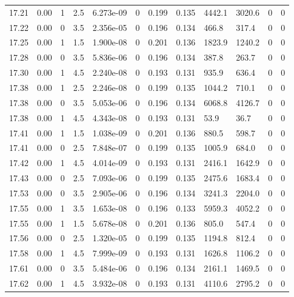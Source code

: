 \documentclass[preview]{standalone}
\begin{document}
{{{{{{{{{{{{{{{{{{\begin{tabular}{L{1.2cm}C{1.2cm} C{0.3cm}C{0.5cm} C{1.4cm}C{1.4cm} C{1.4cm}C{1.4cm} C{1.6cm}C{1.6cm} C{1.6cm}C{1.6cm}}
  17.21  &  0.00  & 1     & 2.5 &  6.273e-09  & 0  &  0.199&   0.135& 4442.1 & 3020.6   &  0 & 0  \\ 
  17.22  &  0.00  & 0     & 3.5 &  2.356e-05  & 0  &  0.196&   0.134& 466.8 & 317.4   &  0 & 0  \\ 
  17.25  &  0.00  & 1     & 1.5 &  1.900e-08  & 0  &  0.201&   0.136& 1823.9 & 1240.2   &  0 & 0  \\ 
  17.28  &  0.00  & 0     & 3.5 &  5.836e-06  & 0  &  0.196&   0.134& 387.8 & 263.7   &  0 & 0  \\ 
  17.30  &  0.00  & 1     & 4.5 &  2.240e-08  & 0  &  0.193&   0.131& 935.9 & 636.4   &  0 & 0  \\ 
  17.38  &  0.00  & 1     & 2.5 &  2.246e-08  & 0  &  0.199&   0.135& 1044.2 & 710.1   &  0 & 0  \\ 
  17.38  &  0.00  & 0     & 3.5 &  5.053e-06  & 0  &  0.196&   0.134& 6068.8 & 4126.7   &  0 & 0  \\ 
  17.38  &  0.00  & 1     & 4.5 &  4.343e-08  & 0  &  0.193&   0.131& 53.9 & 36.7   &  0 & 0  \\ 
  17.41  &  0.00  & 1     & 1.5 &  1.038e-09  & 0  &  0.201&   0.136& 880.5 & 598.7   &  0 & 0  \\ 
  17.41  &  0.00  & 0     & 2.5 &  7.848e-07  & 0  &  0.199&   0.135& 1005.9 & 684.0   &  0 & 0  \\ 
  17.42  &  0.00  & 1     & 4.5 &  4.014e-09  & 0  &  0.193&   0.131& 2416.1 & 1642.9   &  0 & 0  \\ 
  17.43  &  0.00  & 0     & 2.5 &  7.093e-06  & 0  &  0.199&   0.135& 2475.6 & 1683.4   &  0 & 0  \\ 
  17.53  &  0.00  & 0     & 3.5 &  2.905e-06  & 0  &  0.196&   0.134& 3241.3 & 2204.0   &  0 & 0  \\ 
  17.55  &  0.00  & 1     & 3.5 &  1.653e-08  & 0  &  0.196&   0.133& 5959.3 & 4052.2   &  0 & 0  \\ 
  17.55  &  0.00  & 1     & 1.5 &  5.678e-08  & 0  &  0.201&   0.136& 805.0 & 547.4   &  0 & 0  \\ 
  17.56  &  0.00  & 0     & 2.5 &  1.320e-05  & 0  &  0.199&   0.135& 1194.8 & 812.4   &  0 & 0  \\ 
  17.58  &  0.00  & 1     & 4.5 &  7.999e-09  & 0  &  0.193&   0.131& 1626.8 & 1106.2   &  0 & 0  \\ 
  17.61  &  0.00  & 0     & 3.5 &  5.484e-06  & 0  &  0.196&   0.134& 2161.1 & 1469.5   &  0 & 0  \\ 
  17.62  &  0.00  & 1     & 4.5 &  3.932e-08  & 0  &  0.193&   0.131& 4110.6 & 2795.2   &  0 & 0  \\ 

\end{tabular}}}}}}}}}}}}}}}}}}}
\end{document}
